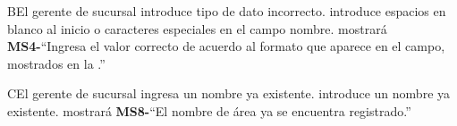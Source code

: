 		\begin{UCtrayectoriaA}{B}{El gerente de sucursal introduce tipo de dato incorrecto.}
			\UCpaso[\UCactor] introduce espacios en blanco al inicio o caracteres especiales en el campo nombre.
			\UCpaso mostrará {\bf MS4-}``Ingresa el valor correcto de acuerdo al formato que aparece en el campo, mostrados en la .''
		\end{UCtrayectoriaA}

		\begin{UCtrayectoriaA}{C}{El gerente de sucursal ingresa un nombre ya existente.}
			\UCpaso[\UCactor] introduce un nombre ya existente.
			\UCpaso mostrará {\bf MS8-}``El nombre de área ya se encuentra registrado.''
		\end{UCtrayectoriaA}